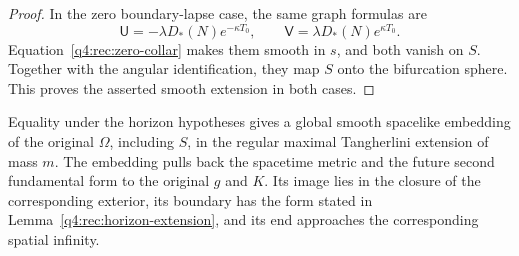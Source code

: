 \begin{proof}
In the zero boundary-lapse case, the same graph formulas are
\[
 \mathsf U=-\lambda D_*(N)e^{-\kappa T_0},\qquad
 \mathsf V=\lambda D_*(N)e^{\kappa T_0}.
\]
Equation~\eqref{q4:rec:zero-collar} makes them smooth in $s$, and both vanish on
$S$.  Together with the angular identification, they map $S$ onto the
bifurcation sphere.  This proves the asserted smooth extension in both cases.
\end{proof}

\begin{proposition}
\label{q4:rec:embedding}
Equality under the horizon hypotheses gives a global smooth spacelike
embedding of the original $\Omega$, including $S$, in the regular maximal
Tangherlini extension of mass $m$.  The embedding pulls back the spacetime
metric and the future second fundamental form to the original $g$ and $K$.
Its image lies in the closure of the corresponding exterior, its boundary
has the form stated in Lemma~\ref{q4:rec:horizon-extension}, and its end
approaches the corresponding spatial infinity.
\end{proposition}

